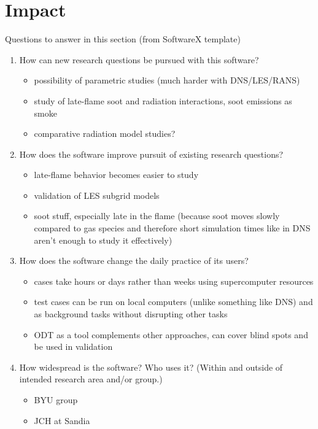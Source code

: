 \documentclass[preprint,12pt, a4paper]{elsarticle}
\begin{document}
\section{Impact}
\label{sec:impact}

Questions to answer in this section (from SoftwareX template)
\begin{enumerate}
	\item How can new research questions be pursued with this software?
		\begin{itemize}
			\item possibility of parametric studies (much harder with DNS/LES/RANS)
			\item study of late-flame soot and radiation interactions, soot emissions as smoke
			\item comparative radiation model studies?
		\end{itemize}
	\item How does the software improve pursuit of existing research questions?
		\begin{itemize}
			\item late-flame behavior becomes easier to study
			\item validation of LES subgrid models
			\item soot stuff, especially late in the flame (because soot moves slowly compared to gas species and therefore short simulation times like in DNS aren't enough to study it effectively)
		\end{itemize}
	\item How does the software change the daily practice of its users?
		\begin{itemize}
			\item cases take hours or days rather than weeks using supercomputer resources
			\item test cases can be run on local computers (unlike something like DNS) and as background tasks without disrupting other tasks
			\item ODT as a tool complements other approaches, can cover blind spots and be used in validation
		\end{itemize}
	\item How widespread is the software? Who uses it? (Within and outside of intended research area and/or group.)
		\begin{itemize}
			\item BYU group
			\item JCH at Sandia

\end{itemize}
\end{enumerate}
\end{document}

